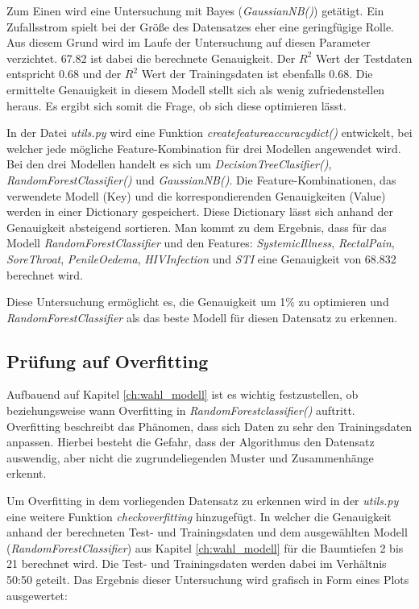 \documentclass[13pt,a4paper, listof=entryprefix, bibliography=totocnumbered,toc=listofnumbered,lof=listofnumbered]{scrartcl}
\begin{document}
Zum Einen wird eine Untersuchung mit Bayes (\textit{GaussianNB()}) getätigt. Ein Zufallsstrom spielt bei der Größe des Datensatzes eher eine geringfügige
Rolle. Aus diesem Grund wird im Laufe der Untersuchung auf diesen Parameter verzichtet. 67.82 ist dabei die berechnete Genauigkeit. Der $R^2$ Wert der Testdaten entspricht 0.68 und der $R^2$ Wert der
Trainingsdaten ist ebenfalls 0.68. Die ermittelte Genauigkeit in diesem Modell stellt sich als wenig zufriedenstellen heraus. Es ergibt sich somit die Frage,
ob sich diese optimieren lässt.

In der Datei \textit{utils.py} wird eine Funktion \textit{create\textunderscore feature\textunderscore accuracy\textunderscore dict()} entwickelt, bei welcher jede mögliche Feature-Kombination für drei Modellen angewendet wird. 
Bei den drei Modellen handelt es sich um  \textit{DecisionTreeClasifier()}, \textit{RandomForestClassifier()} und \textit{GaussianNB()}. Die Feature-Kombinationen, das verwendete Modell (Key) und die korrespondierenden Genauigkeiten (Value) werden in 
einer Dictionary gespeichert. Diese Dictionary lässt sich anhand der Genauigkeit absteigend sortieren. Man kommt zu dem Ergebnis, dass für das Modell \textit{RandomForestClassifier} und 
den Features: \textit{Systemic\textunderscore  Illness}, \textit{Rectal\textunderscore Pain}, \textit{Sore\textunderscore Throat}, \textit{Penile\textunderscore Oedema}, \textit{HIV\textunderscore Infection} und \textit{STI} 
eine Genauigkeit von 68.832 berechnet wird. 

Diese Untersuchung ermöglicht es, die Genauigkeit um 1\% zu optimieren und \textit{RandomForestClassifier} als das beste Modell für diesen Datensatz zu erkennen.  

	\subsection{Prüfung auf Overfitting}
		\label{ch:pruefung_overfitting}

Aufbauend auf Kapitel \ref{ch:wahl_modell} ist es wichtig festzustellen, ob beziehungsweise wann Overfitting in \textit{RandomForestclassifier()} auftritt. Overfitting beschreibt das Phänomen, dass
sich Daten zu sehr den Trainingsdaten anpassen. Hierbei besteht die Gefahr, dass der Algorithmus den Datensatz auswendig, aber nicht die zugrundeliegenden Muster und Zusammenhänge erkennt.

Um Overfitting in dem vorliegenden Datensatz zu erkennen wird in der \textit{utils.py} eine weitere Funktion \textit{check\textunderscore over\textunderscore fitting} hinzugefügt. In welcher
die Genauigkeit anhand der berechneten Test- und Trainingsdaten und dem ausgewählten Modell (\textit{RandomForestClassifier}) aus 
Kapitel \ref{ch:wahl_modell} für die Baumtiefen 2 bis 21 berechnet wird. Die Test- und Trainingsdaten werden dabei im Verhältnis 50:50 geteilt. 
Das Ergebnis dieser Untersuchung wird grafisch in Form eines Plots ausgewertet: 
\end{document}
